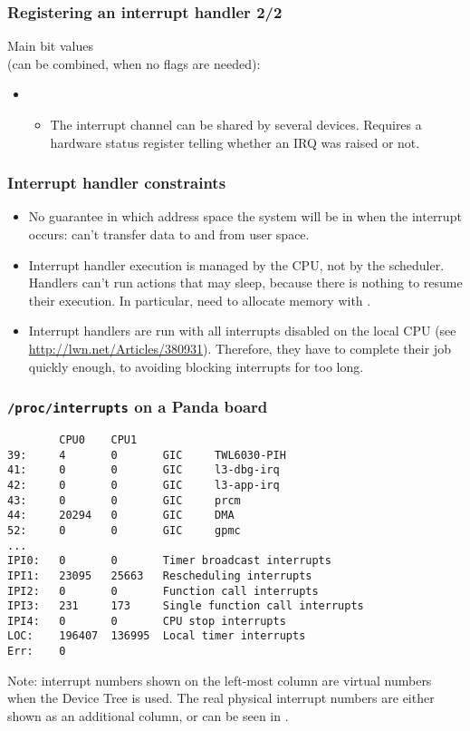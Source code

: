 \begin{frame}
  \frametitle{Registering an interrupt handler 2/2}
  Main  bit values\\
  (can be combined,  when no flags are needed):
  \begin{itemize}
     \item {}
     \begin{itemize}
        \item The interrupt channel can be shared by several
        devices. Requires a hardware status register telling whether
        an IRQ was raised or not.
     \end{itemize}
  \end{itemize}
\end{frame}

\begin{frame}
  \frametitle{Interrupt handler constraints}
  \begin{itemize}
  \item No guarantee in which address space the system will be in when
    the interrupt occurs: can't transfer data to and from user space.
  \item Interrupt handler execution is managed by the CPU, not by the
    scheduler.  Handlers can't run actions that may sleep, because
    there is nothing to resume their execution. In particular, need to
    allocate memory with .
  \item Interrupt handlers are run with all interrupts disabled on
    the local CPU (see \url{http://lwn.net/Articles/380931}).
    Therefore, they have to complete their job quickly
    enough, to avoiding blocking interrupts for too long.
  \end{itemize}
\end{frame}

\begin{frame}[fragile]
  \frametitle{{\tt /proc/interrupts} on a Panda board}
\begin{block}{}
  \footnotesize
\begin{verbatim}
        CPU0    CPU1
39:     4       0       GIC     TWL6030-PIH
41:     0       0       GIC     l3-dbg-irq
42:     0       0       GIC     l3-app-irq
43:     0       0       GIC     prcm
44:     20294   0       GIC     DMA
52:     0       0       GIC     gpmc
...
IPI0:   0       0       Timer broadcast interrupts
IPI1:   23095   25663   Rescheduling interrupts
IPI2:   0       0       Function call interrupts
IPI3:   231     173     Single function call interrupts
IPI4:   0       0       CPU stop interrupts
LOC:    196407  136995  Local timer interrupts
Err:    0
\end{verbatim}
\end{block}
  \footnotesize
  Note: interrupt numbers shown on the left-most column are virtual
  numbers when the Device Tree is used. The real physical interrupt
  numbers are either shown as an additional column, or can be seen in
  .
\end{frame}

